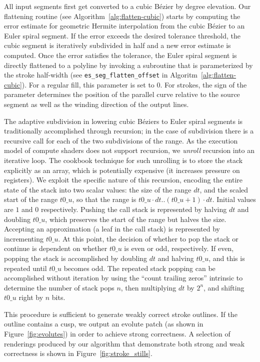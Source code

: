 \documentclass[sigconf, nonacm]{acmart}
\begin{document}
All input segments first get converted to a cubic Bézier by degree elevation. Our flattening routine (see Algorithm~\ref{alg:flatten-cubic}) starts by computing the error estimate for geometric Hermite interpolation from the cubic Bézier to an Euler spiral segment. If the error exceeds the desired tolerance threshold, the cubic segment is iteratively subdivided in half and a new error estimate is computed. Once the error satisfies the tolerance, the Euler spiral segment is directly flattened to a polyline by invoking a subroutine that is parameterized by the stroke half-width (see \texttt{es\_seg\_flatten\_offset} in Algoritm~\ref{alg:flatten-cubic}). For a regular fill, this parameter is set to $0$. For strokes, the sign of the parameter determines the position of the parallel curve relative to the source segment as well as the winding direction of the output lines.

The adaptive subdivision in lowering cubic Béziers to Euler spiral segments is traditionally accomplished through recursion; in the case of subdivision there is a recursive call for each of the two subdivisions of the range. As the execution model of compute shaders does not support recursion, we \emph{unroll} recursion into an iterative loop. The cookbook technique for such unrolling is to store the stack explicitly as an array, which is potentially expensive (it increases pressure on registers). We exploit the specific nature of this recursion, encoding the entire state of the stack into two scalar values: the size of the range $dt$, and the scaled start of the range $t0\_u$, so that the range is $t0\_u \cdot dt .. (t0\_u + 1) \cdot dt$. Initial values are $1$ and $0$ respectively. Pushing the call stack is represented by halving $dt$ and doubling $t0\_u$, which preserves the start of the range but halves the size. Accepting an approximation (a leaf in the call stack) is represented by incrementing $t0\_u$. At this point, the decision of whether to pop the stack or continue is dependent on whether $t0\_u$ is even or odd, respectively. If even, popping the stack is accomplished by doubling $dt$ and halving $t0\_u$, and this is repeated until $t0\_u$ becomes odd. The repeated stack popping can be accomplished without iteration by using the ``count trailing zeros'' intrinsic to determine the number of stack pops $n$, then multiplying $dt$ by $2^n$, and shifting $t0\_u$ right by $n$ bits.

This procedure is sufficient to generate weakly correct stroke outlines. If the outline contains a cusp, we output an evolute patch (as shown in Figure~\ref{fig:evolutes}) in order to achieve strong correctness. A selection of renderings produced by our algorithm that demonstrate both strong and weak correctness is shown in Figure~\ref{fig:stroke_stills}.
\end{document}
